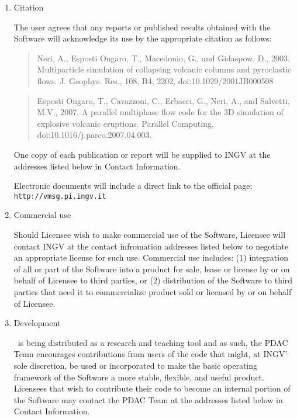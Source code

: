 \begin{enumerate}
\item Citation

The user agrees that any reports or published results obtained with the Software will acknowledge its use by the appropriate citation as follows: 

\begin{quote}
Neri, A., Esposti Ongaro, T., Macedonio, G., and Gidaspow, D., 2003. Multiparticle simulation of collapsing volcanic columns and pyroclastic flows. J. Geophys. Res., 108, B4, 2202, doi:10.1029/2001JB000508
\end{quote}

\begin{quote}
Esposti Ongaro, T., Cavazzoni, C., Erbacci, G., Neri, A., and Salvetti, M.V., 2007. A parallel multiphase flow code for the 3D simulation of explosive volcanic eruptions. Parallel Computing, doi:10.1016/j.parco.2007.04.003.
\end{quote}

One copy of each publication or report will be supplied to INGV at the addresses listed below in Contact Information.

Electronic documents will include a direct link to the official page: {\tt http://vmsg.pi.ingv.it}

\item Commercial use

Should Licensee wish to make commercial use of the Software, Licensee will contact INGV at the contact infromation addresses listed below to negotiate an appropriate license for such use. Commercial use includes: (1) integration of all or part of the Software into a product for sale, lease or license by or on behalf of Licensee to third parties, or (2) distribution of the Software to third parties that need it to commercialize product sold or licensed by or on behalf of Licensee. 

\item Development

\PDAC\ is being distributed as a research and teaching tool and as such, the PDAC Team encourages contributions from users of the code that might, at INGV’ sole discretion, be used or incorporated to make the basic operating framework of the Software a more stable, ﬂexible, and useful product. Licensees that wish to contribute their code to become an internal portion of the Software may contact the PDAC Team at the addresses listed below in Contact Information.

\end{enumerate}
\newpage
